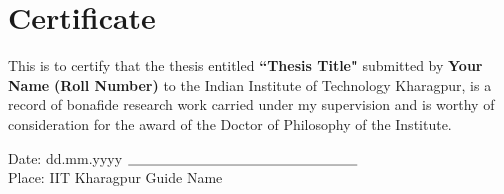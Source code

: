 \chapter{Certificate}

\begin{Spacing}{1.5}
\sffamily

This is to certify that the thesis entitled 
\textbf{``Thesis Title"} submitted by \textbf{Your Name} \textbf{(Roll Number)} to the Indian Institute of Technology Kharagpur, is a record of bonafide research work carried under my supervision and is worthy of consideration for the award of the Doctor of Philosophy of the Institute.

\end{Spacing}




\vspace{2cm}

Date: dd.mm.yyyy \hspace{0pt plus 1filll} $\underline{\hspace{5.8cm}}$\\

Place: IIT Kharagpur \hspace{0pt plus 1filll} Guide Name\\

